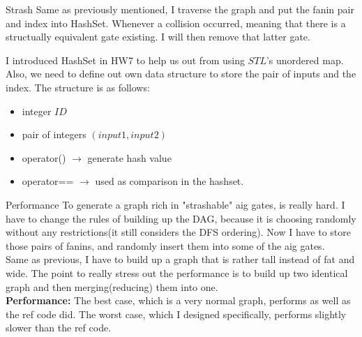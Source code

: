 \documentclass[12pt,a4paper]{report}
\begin{document}
\begin{section}{Strash}
  Same as previously mentioned, I traverse the graph and put the fanin pair and index into HashSet. Whenever a
  collision occurred, meaning that there is a structually equivalent gate existing. I will then remove
  that latter gate.

  I introduced HashSet in HW7 to help us out from using $STL$'s unordered map. Also, we need to define
  out own data structure to store the pair of inputs and the index. The structure is as follows:
  \begin{itemize}
    \item integer $ID$
    \item pair of integers $(input1,input2)$
    \item operator() $\rightarrow$ generate hash value
    \item operator== $\rightarrow$ used as comparison in the hashset.
  \end{itemize}
  \begin{subsection}{Performance}
    To generate a graph rich in "strashable" aig gates, is really hard. I have to change the rules of 
    building up the DAG, because it is choosing randomly without any restrictions(it still considers
    the DFS ordering). Now I have to store those pairs of fanins, and randomly insert them into some 
    of the aig gates. \\
    Same as previous, I have to build up a graph that is rather tall instead of fat
    and wide. The point to really stress out the performance is to build up two identical graph and then
    merging(reducing) them into one.\\

    \textbf{Performance:} The best case, which is a very normal graph, performs as well as the ref code did.
    The worst case, which I designed specifically, performs slightly slower than the ref code.
  \end{subsection}
\end{section}
\end{document}
